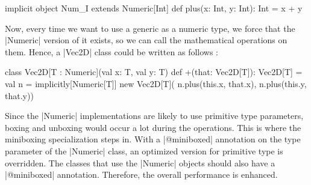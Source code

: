 \begin{lstlisting-nobreak}
 implicit object Num_I extends Numeric[Int] {
   def plus(x: Int, y: Int): Int = x + y
 }
\end{lstlisting-nobreak}

Now, every time we want to use a generic as a numeric type, we force that the |Numeric| version of it exists, so we can call the mathematical operations on them. Hence, a |Vec2D| class could be written as follows :

\begin{lstlisting-nobreak}
 class Vec2D[T : Numeric](val x: T, val y: T) {
   def +(that: Vec2D[T]): Vec2D[T] = {
     val n = implicitly[Numeric[T]]
     new Vec2D[T](
       n.plus(this.x, that.x),
       n.plus(this.y, that.y))
   }
 }
\end{lstlisting-nobreak}

Since the |Numeric| implementations are likely to use primitive type parameters, boxing and unboxing would occur a lot during the operations. This is where the miniboxing specialization steps in. With a |@miniboxed| annotation on the type parameter of the |Numeric| class, an optimized version for primitive type is overridden. The classes that use the |Numeric| objects should also have a |@miniboxed| annotation. Therefore, the overall performance is enhanced.